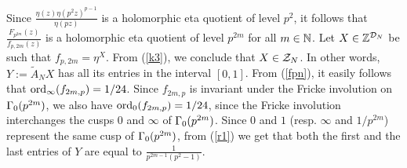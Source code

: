 \documentclass[a4paper,11pt]{amsart}
\begin{document}
Since $\frac{\eta(z)\eta(p^2z)^{p-1}}{\eta(pz)}$ is %
a holomorphic eta quotient of level $p^2$, 
it follows that 
$\frac{F_{p^{2m}}(z)}{f_{p,2m}(z)}$ is a holomorphic eta quotient of level $p^{2m}$ for all $m\in\mathbb{N}$.
Let $X\in\mathbb{Z}^{\mathcal{D}_N}$ be such that $f_{p,2m}=\eta^X$. From  %
(\ref{k3}), we conclude that $X\in\mathcal{Z}_N$.
In other words, $Y:=\widetilde{A}_NX$ has all its entries in the interval $[0,1]$. %
From (\ref{fpn}), it easily follows that 
$\operatorname{ord}_\infty(f_{2m,p})=1/24$. 
Since $f_{2m,p}$ is invariant under the Fricke involution on $\Gamma_0(p^{2m})$, 
we also have $\operatorname{ord}_0(f_{2m,p})=1/24$, since the Fricke involution interchanges the cusps
$0$ and $\infty$ of $\Gamma_0(p^{2m})$. Since $0$ and $1$ (resp. $\infty$ and $1/{p^{2m}}$)
represent the same cusp of $\Gamma_0(p^{2m})$, from %
(\ref{r1}) we get that
both the first and the last entries of $Y$ are equal to 
$\frac1{p^{2m-1}(p^2-1)}$. 


\end{document}

